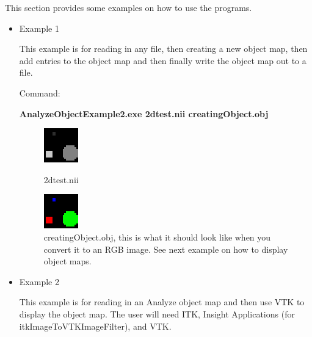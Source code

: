 \documentclass{InsightArticle}
\begin{document}
This section provides some examples on how to use the programs.
\begin{itemize}
\item Example 1 

This example is for reading in any file, then creating a new object map,
then add entries to the object map and then finally write the object map out to a file.

Command:

\textbf{AnalyzeObjectExample2.exe 2dtest.nii creatingObject.obj}


\begin{figure}[h]
  \hfill
  \begin{minipage}[t]{.45\textwidth}
    \begin{center}  
      \includegraphics[width=.28\textwidth]{2dtest.eps}
      \caption{2dtest.nii}
      \label{fig-tc}
    \end{center}
  \end{minipage}
  \hfill
  \begin{minipage}[t]{.45\textwidth}
    \begin{center}  
      \includegraphics[width=.28\textwidth]{creatingObject.eps}
      \caption{creatingObject.obj, this is what it should look like when you convert it to an RGB image.  See next example on how to display 
    object maps.}
      \label{fig-tc}
    \end{center}
  \end{minipage}
  \hfill
\end{figure}
  

\item Example 2

This example is for reading in an Analyze object map and
then use VTK to display the object map.  The user will need ITK,
Insight Applications (for itkImageToVTKImageFilter), and VTK.


\end{itemize}
\end{document}

